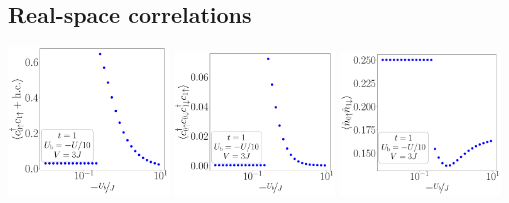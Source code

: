 \documentclass[10pt]{report}
\numberwithin{equation}{section}
\begin{document}
\subsection*{Real-space correlations}
\begin{center}
	\includegraphics[width=0.32\textwidth]{../figures/r1p-t=1.000,J=10.000,0.000,30,V=3J,Ubath=-U_by_10,N=6,U=1.000,889.513,30.pdf}
	\includegraphics[width=0.32\textwidth]{../figures/r-od-t=1.000,J=10.000,0.000,30,V=3J,Ubath=-U_by_10,N=6,U=1.000,889.513,30.pdf}
	\includegraphics[width=0.32\textwidth]{../figures/r-opp-t=1.000,J=10.000,0.000,30,V=3J,Ubath=-U_by_10,N=6,U=1.000,889.513,30.pdf}


\end{center}
\end{document}
